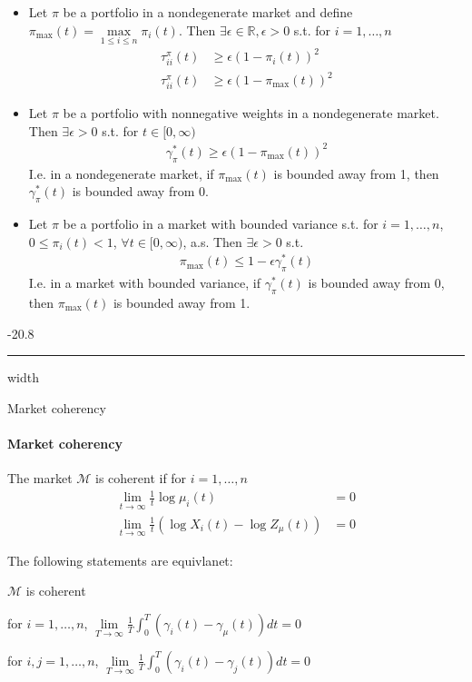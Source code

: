 \documentclass[a4paper,landscape,8pt,fleqn]{scrartcl}
\makeatletter
\renewcommand{\subsubsection}{\@startsection{subsubsection}{1}{0mm}%
{-2\baselineskip}{0.8\baselineskip}%
{\hrule depth 0.2pt width\columnwidth\vspace*{1.2em}\normalsize\bfseries}}
\makeatother
\begin{document}
\begin{multicols*}{3}
\begin{itemize}
\item Let $\pi$ be a portfolio in a nondegenerate market and define $\pi_\text{max}(t) = \max\limits_{1\leq i \leq n} \pi_i(t)$. Then $\exists \epsilon \in \mathbb{R}, \epsilon > 0$ s.t. for $i = 1,\ldots,n$
\begin{align*}
\tau_{ii}^\pi(t) &\geq \epsilon (1-\pi_i(t))^2 \\
\tau_{ii}^\pi(t) &\geq \epsilon (1-\pi_\text{max}(t))^2
\end{align*}
\item Let $\pi$ be a portfolio with nonnegative weights in a nondegenerate market. Then $\exists \epsilon > 0$ s.t. for $t \in [0,\infty)$
\begin{align*}
\gamma_\pi^\ast(t) \geq \epsilon (1-\pi_\text{max}(t))^2
\end{align*}
I.e. in a nondegenerate market, if $\pi_\text{max}(t)$ is bounded away from 1, then $\gamma_\pi^\ast(t)$ is bounded away from 0.
\item Let $\pi$ be a portfolio in a market with bounded variance s.t. for $i=1,\ldots,n$, $0 \leq \pi_i(t) < 1$, $\forall t \in [0,\infty)$, a.s. Then $\exists \epsilon > 0$ s.t.
\begin{align*}
\pi_\text{max}(t) \leq 1 - \epsilon \gamma_\pi^\ast(t)
\end{align*}
I.e. in a market with bounded variance, if $\gamma_\pi^\ast(t)$ is bounded away from 0, then $\pi_\text{max}(t)$ is bounded away from 1.
\end{itemize}

\subsubsection{Market coherency}

\paragraph{Market coherency}

The market $\mathcal{M}$ is coherent if for $i=1, \ldots, n$
\begin{align*}
\lim\limits_{t \rightarrow \infty} \frac{1}{t} \log \mu_i(t) &= 0 \\
\lim\limits_{t \rightarrow \infty} \frac{1}{t} \left( \log X_i(t) - \log Z_\mu(t) \right) &= 0
\end{align*}

The following statements are equivlanet:
\begin{description}[style=multiline,leftmargin=0.7cm,font=\textbf]
\item $\mathcal{M}$ is coherent
\item[$\iff$] for $i = 1, \ldots, n$, $\lim\limits_{T \rightarrow \infty} \frac{1}{T} \int_0^T \left( \gamma_i(t) - \gamma_\mu(t) \right) dt = 0$
\item[$\iff$] for $i,j = 1, \ldots, n$, $\lim\limits_{T \rightarrow \infty} \frac{1}{T} \int_0^T \left( \gamma_i(t) - \gamma_j(t) \right) dt = 0$
\end{description}


\end{multicols*}
\end{document}
